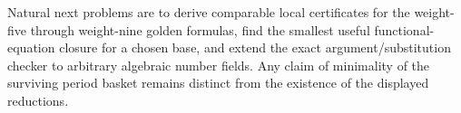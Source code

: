 Natural next problems are to derive comparable local certificates for the
weight-five through weight-nine golden formulas, find the smallest useful
functional-equation closure for a chosen base, and extend the exact
argument/substitution checker to arbitrary algebraic number fields.
Any claim of minimality of the surviving period basket remains distinct
from the existence of the displayed reductions.
